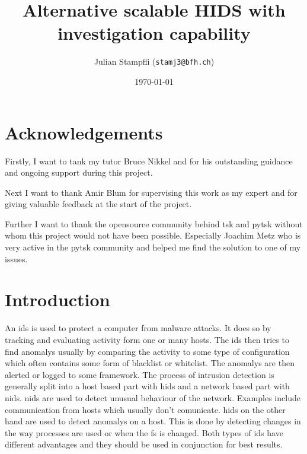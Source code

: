 \documentclass[
	a4paper,					%
	10pt,							%
	twoside,					%
	openright,				%
	notitlepage,			%
	parskip=half,			%
]{scrreprt}					%
\begin{document}
\title{Alternative scalable HIDS with investigation capability}
\date{\today} 
\author{ Julian Stampfli (\texttt{stamj3@bfh.ch}) }
\maketitle
\setcounter{tocdepth}{2}
\tableofcontents
\clearpage


\chapter{Acknowledgements}

Firstly, I want to tank my tutor Bruce Nikkel and for his outstanding guidance and ongoing support during this project.

Next I want to thank Amir Blum for supervising this work as my expert and for giving valuable feedback at the start of the project.

Further I want to thank the \gls{opensource} community behind \gls{tsk} and \gls{pytsk} without whom this project would not have been possible. Especially Joachim Metz who is very active in the \gls{pytsk} community and helped me find the solution to one of my issues.

\chapter{Introduction}

An \gls{ids} is used to protect a computer from \gls{malware} attacks. It does so by tracking and evaluating activity form one or many hosts. The \gls{ids} then tries to find \glspl{anomaly} usually by comparing the activity to some type of configuration which often contains some form of blacklist or whitelist. The \glspl{anomaly} are then alerted or logged to some framework. The process of intrusion detection is generally split into a host based part with \gls{hids} and a network based part with \gls{nids}. \gls{nids} are used to detect unusual behaviour of the network. Examples include communication from hosts which usually don't comunicate. \gls{hids} on the other hand are used to detect \glspl{anomaly} on a host. This is done by detecting changes in the way processes are used or when the \gls{fs} is changed. Both types of \gls{ids} have different advantages and they should be used in conjunction for best results. \cite{needed}
\end{document}
